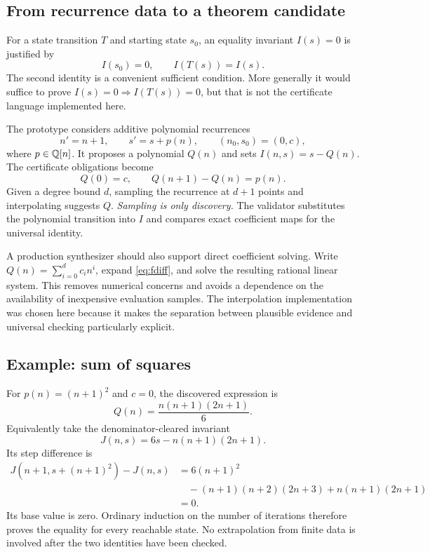 \documentclass[11pt,a4paper]{article}
\begin{document}
\subsection{From recurrence data to a theorem candidate}

For a state transition $T$ and starting state $s_0$, an equality invariant
$I(s)=0$ is justified by
\[
 I(s_0)=0,\qquad I(T(s))=I(s).
\]
The second identity is a convenient sufficient condition. More generally it
would suffice to prove $I(s)=0\Rightarrow I(T(s))=0$, but that is not the
certificate language implemented here.

The prototype considers additive polynomial recurrences
\begin{equation}\label{eq:additive}
 n'=n+1,\qquad s'=s+p(n),\qquad (n_0,s_0)=(0,c),
\end{equation}
where $p\in\mathbb{Q}[n]$. It proposes a polynomial $Q(n)$ and sets
$I(n,s)=s-Q(n)$. The certificate obligations become
\begin{equation}\label{eq:fdiff}
 Q(0)=c,\qquad Q(n+1)-Q(n)=p(n).
\end{equation}
Given a degree bound $d$, sampling the recurrence at $d+1$ points and
interpolating suggests $Q$. \emph{Sampling is only discovery.} The validator
substitutes the polynomial transition into $I$ and compares exact coefficient
maps for the universal identity.

A production synthesizer should also support direct coefficient solving.
Write $Q(n)=\sum_{i=0}^{d}c_i n^i$, expand \eqref{eq:fdiff}, and solve the
resulting rational linear system. This removes numerical concerns and avoids
a dependence on the availability of inexpensive evaluation samples. The
interpolation implementation was chosen here because it makes the separation
between plausible evidence and universal checking particularly explicit.

\subsection{Example: sum of squares}

For $p(n)=(n+1)^2$ and $c=0$, the discovered expression is
\[
 Q(n)=\frac{n(n+1)(2n+1)}6.
\]
Equivalently take the denominator-cleared invariant
\[
 J(n,s)=6s-n(n+1)(2n+1).
\]
Its step difference is
\begin{align*}
 J(n+1,s+(n+1)^2)-J(n,s)
 &=6(n+1)^2\\
 &\quad-(n+1)(n+2)(2n+3)+n(n+1)(2n+1)\\
 &=0.
\end{align*}
Its base value is zero. Ordinary induction on the number of iterations
therefore proves the equality for every reachable state. No extrapolation from
finite data is involved after the two identities have been checked.
\end{document}
